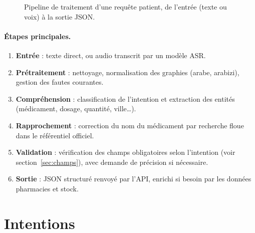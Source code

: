 \documentclass[11pt,a4paper]{article}
\begin{document}
\begin{figure}[htbp]
\caption{Pipeline de traitement d'une requ\^ete patient, de l'entr\'ee (texte ou voix) \`a la sortie JSON.}
\label{fig:pipeline}
\end{figure}

\paragraph{\'Etapes principales.}
\begin{enumerate}[leftmargin=*]
  \item \textbf{Entr\'ee} : texte direct, ou audio transcrit par un mod\`ele ASR.
  \item \textbf{Pr\'etraitement} : nettoyage, normalisation des graphies (arabe, arabizi), gestion des fautes courantes.
  \item \textbf{Compr\'ehension} : classification de l'intention et extraction des entit\'es (m\'edicament, dosage, quantit\'e, ville\ldots).
  \item \textbf{Rapprochement} : correction du nom du m\'edicament par recherche floue dans le r\'ef\'erentiel officiel.
  \item \textbf{Validation} : v\'erification des champs obligatoires selon l'intention (voir section~\ref{sec:champs}), avec demande de pr\'ecision si n\'ecessaire.
  \item \textbf{Sortie} : JSON structur\'e renvoy\'e par l'API, enrichi si besoin par les donn\'ees pharmacies et stock.
\end{enumerate}

\section{Intentions}
\end{document}
